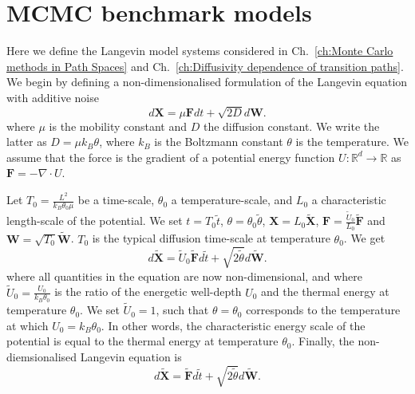 \documentclass[]{cam-thesis}
\begin{document}
\cleardoublepage
{}
\appendix
{}



\chapter{MCMC benchmark models} \label{app:MCMC benchmark models}

Here we define the Langevin model systems considered in Ch.~\ref{ch:Monte Carlo methods in Path Spaces} and Ch.~\ref{ch:Diffusivity dependence of transition paths}. We begin by defining a non-dimensionalised formulation of the Langevin equation with additive noise
\begin{equation}
d\mathbf{X}=\mu\mathbf{F}dt+\sqrt{2D}d\mathbf{W}.
\end{equation}
where $\mu$ is the mobility constant and $D$ the diffusion constant. We write the latter as $D = \mu k_B \theta$, where $k_B$ is the Boltzmann constant $\theta$ is the temperature. We assume that the force is the gradient of a potential energy function $U : \mathbb{R}^d \to \mathbb{R}$  as $\mathbf{F} = - \nabla \cdot U$.

Let $T_{0}=\frac{L^{2}}{k_{B}\theta_{0}\mu}$ be a time-scale, $\theta_{0}$ a temperature-scale, and $L_0$ a characteristic length-scale of the potential. We set $t=T_{0}\tilde{t}$,
$\theta=\theta_{0}\tilde{\theta}$, $\mathbf{X}=L_0 \tilde{\mathbf{X}}$,
$\mathbf{F}= \frac{\tilde{U}_0}{L_0} \tilde{\mathbf{F}}$ and $\mathbf{W}=\sqrt{T_{0}}\tilde{\mathbf{W}}$. $T_{0}$ is the typical diffusion time-scale at temperature $\theta_{0}$. We get
\begin{equation}
	d\mathbf{\tilde{X}}=\tilde{U}_{0} \tilde{\mathbf{F}}d\tilde{t}+\sqrt{2\tilde{\theta}}d\tilde{\mathbf{W}}.
\end{equation}
where all quantities in the equation are now non-dimensional, and where $\tilde{U}_{0}=\frac{U_{0}}{k_{B}\theta_{0}}$ is the ratio
of the energetic well-depth $U_{0}$ and the thermal energy at temperature $\theta_{0}$. We set $\tilde{U}_0 = 1$, such that $\theta = \theta_0$ corresponds to the temperature at which $U_0 = k_B \theta_0$. In other words, the characteristic energy scale of the potential is equal to the thermal energy at temperature $\theta_0$. Finally, the non-diemsionalised Langevin equation is
\begin{equation}
	d\mathbf{\tilde{X}}= \tilde{\mathbf{F}}d\tilde{t}+\sqrt{2\tilde{\theta}}d\tilde{\mathbf{W}}.
\end{equation}
\end{document}
